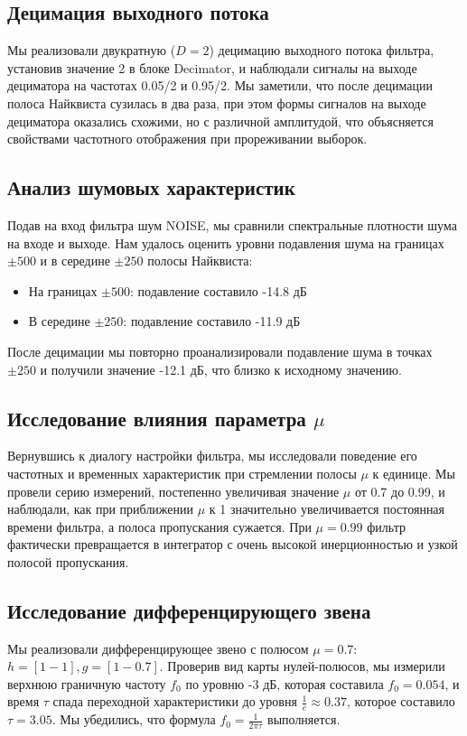\subsection{Децимация выходного потока}
Мы реализовали двукратную ($D = 2$) децимацию выходного потока фильтра, установив значение 2 в блоке Decimator, и наблюдали сигналы на выходе дециматора на частотах 0.05/2 и 0.95/2. Мы заметили, что после децимации полоса Найквиста сузилась в два раза, при этом формы сигналов на выходе дециматора оказались схожими, но с различной амплитудой, что объясняется свойствами частотного отображения при прореживании выборок.

\subsection{Анализ шумовых характеристик}
Подав на вход фильтра шум NOISE, мы сравнили спектральные плотности шума на входе и выходе. Нам удалось оценить уровни подавления шума на границах $\pm500$ и в середине $\pm250$ полосы Найквиста:
\begin{itemize}
    \item На границах $\pm500$: подавление составило -14.8 дБ
    \item В середине $\pm250$: подавление составило -11.9 дБ
\end{itemize}

После децимации мы повторно проанализировали подавление шума в точках $\pm250$ и получили значение -12.1 дБ, что близко к исходному значению.

\subsection{Исследование влияния параметра $\mu$}
Вернувшись к диалогу настройки фильтра, мы исследовали поведение его частотных и временных характеристик при стремлении полосы $\mu$ к единице. Мы провели серию измерений, постепенно увеличивая значение $\mu$ от 0.7 до 0.99, и наблюдали, как при приближении $\mu$ к 1 значительно увеличивается постоянная времени фильтра, а полоса пропускания сужается. При $\mu = 0.99$ фильтр фактически превращается в интегратор с очень высокой инерционностью и узкой полосой пропускания.

\subsection{Исследование дифференцирующего звена}
Мы реализовали дифференцирующее звено с полюсом $\mu = 0.7$: $h = [1 -1], g = [1 -0.7]$. Проверив вид карты нулей-полюсов, мы измерили верхнюю граничную частоту $f_0$ по уровню -3 дБ, которая составила $f_0 = 0.054$, и время $\tau$ спада переходной характеристики до уровня $\frac{1}{e} \approx 0.37$, которое составило $\tau = 3.05$. Мы убедились, что формула $f_0 = \frac{1}{2\pi\tau}$ выполняется.

